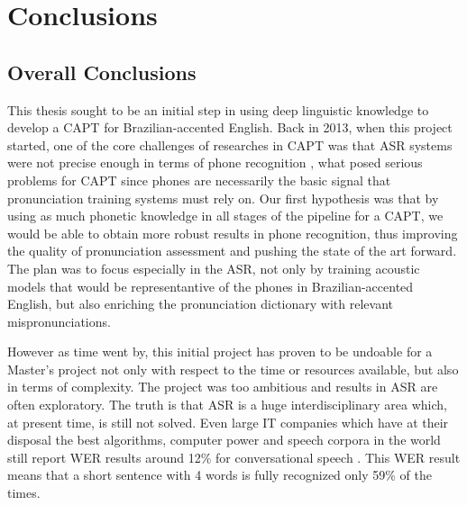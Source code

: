 \chapter{Conclusions}\label{ch:conclusions}

\section*{Overall Conclusions}\label{sec:overall-conclusions}

This thesis sought to be an initial step in using deep linguistic knowledge to develop a \ac{CAPT} for Brazilian-accented English. Back in 2013, when this project started, one of the core challenges of researches in \ac{CAPT} was that \ac{ASR} systems were not precise enough in terms of phone recognition \cite{Witt2012}, what posed serious problems for \ac{CAPT} since phones are necessarily the basic signal that pronunciation training systems must rely on. Our first hypothesis was that by using as much phonetic knowledge in all stages of the pipeline for a \ac{CAPT}, we would be able to obtain more robust results in  phone recognition, thus improving the quality of pronunciation assessment and pushing the state of the art forward. The plan was to focus especially in the \ac{ASR}, not only by training acoustic models that would be representantive of the phones in Brazilian-accented English, but also enriching the pronunciation dictionary with relevant mispronunciations. 

However as time went by, this initial project has proven to be undoable for a Master's project not only with respect to the time or resources available, but also in terms of complexity. The project was too ambitious and results in \ac{ASR} are often exploratory. The truth is that \ac{ASR} is a huge interdisciplinary area which, at present time, is still not solved. Even large IT companies which have at their disposal the best algorithms, computer power and speech corpora in the world still report \ac{WER} results around 12\% for conversational speech  \cite{Huang2014}. This \ac{WER} result means that a short sentence with 4 words is fully recognized only 59\% of the times.

